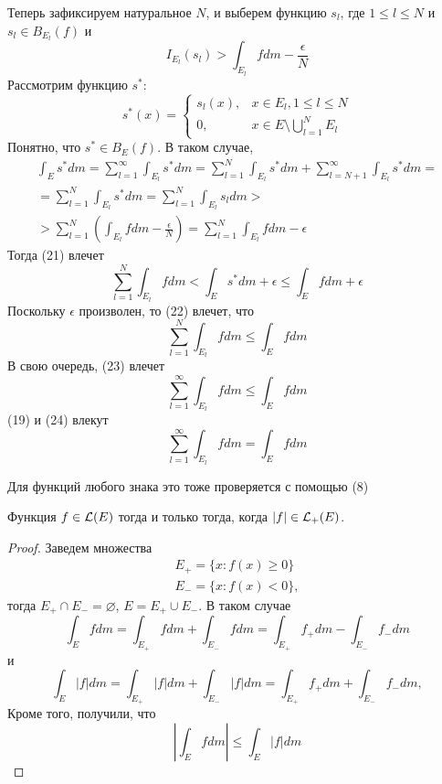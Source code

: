 \documentclass[main]{subfiles}
\begin{document}
\begin{longProof}
\begin{enumerate}
              Теперь зафиксируем натуральное $N$, и выберем функцию $s_l$, где $1 \le l \le N$ и $s_l \in B_{E_l}(f)$ и
              \[I_{E_l} (s_l) > \int_{E_l} f dm - \frac{\epsilon}{N} \tag{20}\]
              Рассмотрим функцию $s^*$:
              \[s^*(x) = \begin{cases}
                      s_l(x), & x \in E_l, 1 \le l \le N              \\
                      0,      & x \in E \setminus \bigcup_{l=1}^N E_l
                  \end{cases}\]
              Понятно, что $s^* \in B_E(f)$.
              В таком случае,
              \begin{multline*}
                  \int_E s^* dm = \sum_{l=1}^{\infty} \int_{E_l} s^* dm = \sum_{l=1}^{N} \int_{E_l} s^* dm + \sum_{l = N+1}^{\infty} \int_{E_l} s^* dm =\\
                  = \sum_{l=1}^{N} \int_{E_l} s^* dm = \sum_{l=1}^{N} \int_{E_l} s_l dm >\\
                  > \sum_{l=1}^{N} \left(\int_{E_l} f dm - \frac{\epsilon}{N}\right) = \sum_{l=1}^{N} \int_{E_l} f dm - \epsilon \tag{21}
              \end{multline*}
              Тогда (21) влечет
              \[\sum_{l=1}^{N} \int_{E_l} fdm < \int_E s^* dm + \epsilon \le \int_{E} fdm + \epsilon \tag{22}\]
              Поскольку $\epsilon$ произволен, то (22) влечет, что
              \[\sum_{l=1}^{N} \int_{E_l} fdm \le \int_{E} fdm \tag{23}\]
              В свою очередь, (23) влечет
              \[\sum_{l=1}^{\infty} \int_{E_l} fdm \le \int_{E} fdm \tag{24}\]
              (19) и (24) влекут
              \[\sum_{l=1}^{\infty} \int_{E_l} fdm = \int_{E} fdm \tag{25}\]
    \end{enumerate}

    Для функций любого знака это тоже проверяется с помощью (8)
\end{longProof}

\begin{corollary}
    Функция $f \in \mathcal{L}(E)$ тогда и только тогда, когда $|f| \in \mathcal{L}_+(E)$.
\end{corollary}
\begin{proof}
    Заведем множества
    \begin{gather*}
        E_+ = \{x: f(x) \ge 0\} \\
        E_- = \{x: f(x) < 0\},
    \end{gather*}
    тогда $E_+ \cap E_- = \varnothing$, $E = E_+ \cup E_-$.
    В таком случае
    \[\int_E f dm = \int_{E_+} fdm + \int_{E_-} fdm = \int_{E_+} f_+ dm - \int_{E_-} f_- dm\]
    и
    \[\int_E |f| dm = \int_{E_+} |f| dm + \int_{E_-} |f| dm = \int_{E_+} f_+ dm + \int_{E_-} f_- dm,\]
    Кроме того, получили, что
    \[\left| \int_E fdm \right| \le \int_E |f| dm\]
\end{proof}
\end{document}
